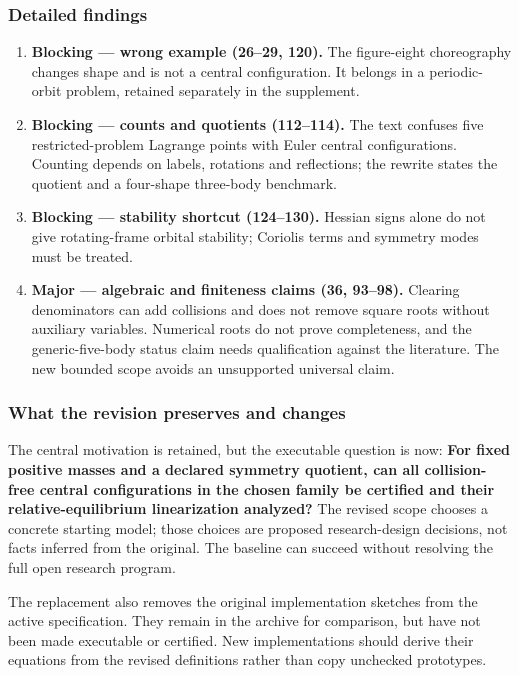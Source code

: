 \documentclass[
  11pt,
]{article}
\begin{document}
\subsubsection{Detailed findings}

\begin{enumerate}
\def\labelenumi{\arabic{enumi}.}
\item
  \textbf{Blocking --- wrong example (26--29, 120).} The figure-eight
  choreography changes shape and is not a central configuration. It
  belongs in a periodic-orbit problem, retained separately in the
  supplement.
\item
  \textbf{Blocking --- counts and quotients (112--114).} The text
  confuses five restricted-problem Lagrange points with Euler central
  configurations. Counting depends on labels, rotations and reflections;
  the rewrite states the quotient and a four-shape three-body benchmark.
\item
  \textbf{Blocking --- stability shortcut (124--130).} Hessian signs
  alone do not give rotating-frame orbital stability; Coriolis terms and
  symmetry modes must be treated.
\item
  \textbf{Major --- algebraic and finiteness claims (36, 93--98).}
  Clearing denominators can add collisions and does not remove square
  roots without auxiliary variables. Numerical roots do not prove
  completeness, and the generic-five-body status claim needs
  qualification against the literature. The new bounded scope avoids an
  unsupported universal claim.
\end{enumerate}

\subsubsection{What the revision preserves and changes}

The central motivation is retained, but the executable question is now:
\textbf{For fixed positive masses and a declared symmetry quotient, can
all collision-free central configurations in the chosen family be
certified and their relative-equilibrium linearization analyzed?} The
revised scope chooses a concrete starting model; those choices are
proposed research-design decisions, not facts inferred from the
original. The baseline can succeed without resolving the full open
research program.

The replacement also removes the original implementation sketches from
the active specification. They remain in the archive for comparison, but
have not been made executable or certified. New implementations should
derive their equations from the revised definitions rather than copy
unchecked prototypes.
\end{document}
